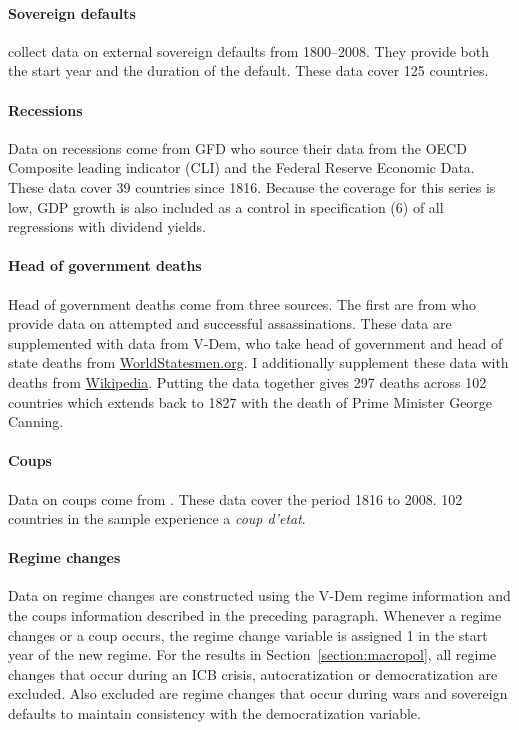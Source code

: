 \paragraph{Sovereign defaults}
\cite{Reinhart2009} collect data on external sovereign defaults from 1800--2008. They provide both the start year and the duration of the default. These data cover 125 countries.

\paragraph{Recessions}
Data on recessions come from GFD who source their data from the OECD Composite leading indicator (CLI) and the Federal Reserve Economic Data. These data cover 39 countries since 1816. Because the coverage for this series is low, GDP growth is also included as a control in specification (6) of all regressions with dividend yields.

\paragraph{Head of government deaths}
Head of government deaths come from three sources. The first are from \cite{Jones2009} who provide data on attempted and successful assassinations. These data are supplemented with data from V-Dem, who take head of government and head of state deaths from \href{https://www.worldstatesmen.org/}{WorldStatesmen.org}. I additionally supplement these data with deaths from \href{https://en.wikipedia.org/wiki/List_of_heads_of_state_and_government_who_died_in_office}{Wikipedia}.  Putting the data together gives 297 deaths across 102 countries which extends back to 1827 with the death of Prime Minister George Canning.

\paragraph{Coups}
Data on coups come from \cite{Przeworski2013}. These data cover the period 1816 to 2008. 102 countries in the sample experience a \textit{coup d'etat}.

\paragraph{Regime changes}
Data on regime changes are constructed using the V-Dem regime information and the coups information described in the preceding paragraph. Whenever a regime changes or a coup occurs, the regime change variable is assigned 1 in the start year of the new regime. For the results in Section~\ref{section:macropol}, all regime changes that occur during an ICB crisis, autocratization or democratization are excluded. Also excluded are regime changes that occur during wars and sovereign defaults to maintain consistency with the democratization variable.

